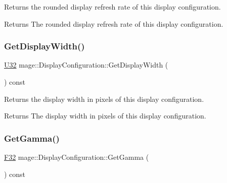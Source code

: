 Returns the rounded display refresh rate of this display configuration.

\begin{DoxyReturn}{Returns}
The rounded display refresh rate of this display configuration. 
\end{DoxyReturn}
\hypertarget{structmage_1_1_display_configuration_a702c5b21341cd347d94b576a4cf3740a}{}\label{structmage_1_1_display_configuration_a702c5b21341cd347d94b576a4cf3740a} 
\subsubsection{\texorpdfstring{Get\+Display\+Width()}{GetDisplayWidth()}}
{\footnotesize\ttfamily \hyperlink{namespacemage_a41c104c036fba3756a74e19f793eeaa1}{U32} mage\+::\+Display\+Configuration\+::\+Get\+Display\+Width (\begin{DoxyParamCaption}{ }\end{DoxyParamCaption}) const\hspace{0.3cm}{\ttfamily [noexcept]}}

Returns the display width in pixels of this display configuration.

\begin{DoxyReturn}{Returns}
The display width in pixels of this display configuration. 
\end{DoxyReturn}
\hypertarget{structmage_1_1_display_configuration_a7b86a9b87951e560bc910d6537dc2f2f}{}\label{structmage_1_1_display_configuration_a7b86a9b87951e560bc910d6537dc2f2f} 
\subsubsection{\texorpdfstring{Get\+Gamma()}{GetGamma()}}
{\footnotesize\ttfamily \hyperlink{namespacemage_aa97e833b45f06d60a0a9c4fc22ae02c0}{F32} mage\+::\+Display\+Configuration\+::\+Get\+Gamma (\begin{DoxyParamCaption}{ }\end{DoxyParamCaption}) const\hspace{0.3cm}{\ttfamily [noexcept]}}

